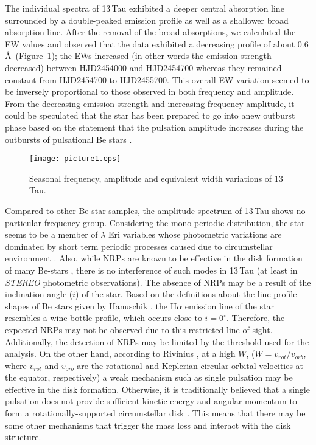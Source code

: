 \documentclass[]{article}
\begin{document}
The individual spectra of 13\,Tau exhibited a deeper central absorption line surrounded by a double-peaked emission profile as well as a shallower broad absorption line. After the removal of the broad absorptions, we calculated the EW values and observed that the data exhibited a decreasing profile of about 0.6 \AA\ (Figure~\ref{fig:figure1}); the EWs increased (in other words the emission strength decreased) between HJD2454000 and HJD2454700 whereas they remained constant from HJD2454700 to HJD2455700. This overall EW variation seemed to be inversely proportional to those observed in both frequency and amplitude. From the decreasing emission strength and increasing frequency amplitude, it could be speculated that the star has been prepared to go into anew outburst phase based on the statement that the pulsation amplitude increases during the outbursts of pulsational Be stars \cite{Kurtz2015}.


\begin{figure}[!t]
\begin{center}
\texttt{[image: picture1.eps]}
\caption{Seasonal frequency, amplitude and equivalent width variations of 13\,Tau.}
\label{fig:figure1}
\end{center}
\end{figure} 


Compared to other Be star samples, the amplitude spectrum of 13\,Tau shows no particular frequency group. Considering the mono-periodic distribution, the star seems to be a member of $\lambda$ Eri variables whose photometric variations are dominated by short term periodic processes caused due to circumstellar environment \cite{rivinius2013}. Also, while NRPs are known to be effective in the disk formation of many Be-stars \cite{Rivinius1998,rivinius2013}, there is no interference of such modes in 13\,Tau (at least in {\sl STEREO} photometric observations). The absence of NRPs may be a result of the inclination angle ($i$) of the star. Based on the definitions about the line profile shapes of Be stars given by Hanuschik \cite{hanuschik1996}, the H{$\alpha$} emission line of the star resembles a wine bottle profile, which occurs close to $i = 0^{\circ}$. Therefore, the expected NRPs may not be observed due to this restricted line of sight. Additionally, the detection of NRPs may be limited by the threshold used for the analysis. On the other hand, according to Rivinius \cite{rivinius2013}, at a high $W$, ($W=v_{rot}/v_{orb}$, where $v_{rot}$ and $v_{orb}$ are the rotational and Keplerian circular orbital velocities at the equator, respectively) a weak mechanism such as single pulsation may be effective in the disk formation. Otherwise, it is traditionally believed that a single pulsation does not provide sufficient kinetic energy and angular momentum to form a rotationally-supported circumstellar disk \cite{Owocki2004}. This means that there may be some other mechanisms that trigger the mass loss and interact with the disk structure.
\end{document}
